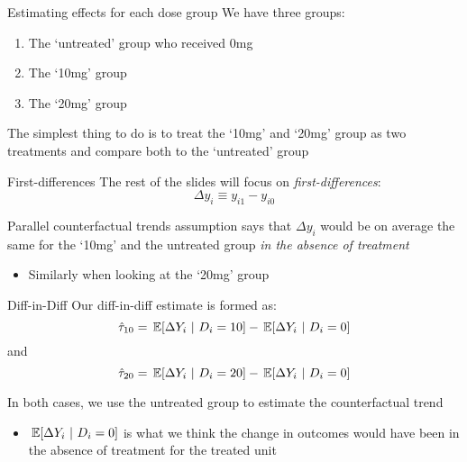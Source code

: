 \documentclass[aspectratio=43,t]{beamer}
\begin{document}
\begin{frame}{Estimating effects for each dose group}
  We have three groups:
  \begin{enumerate}
    \item The `untreated' group who received 0mg

    \item The `10mg' group

    \item The `20mg' group
  \end{enumerate}

  \bigskip
  The simplest thing to do is to treat the `10mg' and `20mg' group as two treatments and compare both to the `untreated' group
\end{frame}

\begin{frame}{First-differences}
  The rest of the slides will focus on \emph{first-differences}:
  $$
    \Delta y_i \equiv y_{i1} - y_{i0}
  $$

  \bigskip
  Parallel counterfactual trends assumption says that $\Delta y_i$ would be on average the same for the `10mg' and the untreated group \emph{in the absence of treatment}
  \begin{itemize}
    \item Similarly when looking at the `20mg' group
  \end{itemize}
\end{frame}


\begin{frame}{Diff-in-Diff}
  Our diff-in-diff estimate is formed as:
  $$
    \hat{\tau}_{10} = \expec{\Delta Y_i}{D_i = 10} - \expec{\Delta Y_i}{D_i = 0}
  $$
  and
  $$
    \hat{\tau}_{20} = \expec{\Delta Y_i}{D_i = 20} - \expec{\Delta Y_i}{D_i = 0}
  $$

  \bigskip
  In both cases, we use the untreated group to estimate the counterfactual trend
  \begin{itemize}
    \item $\expec{\Delta Y_i}{D_i = 0}$ is what we think the change in outcomes would have been in the absence of treatment for the treated unit
  \end{itemize}
\end{frame}

\end{document}
